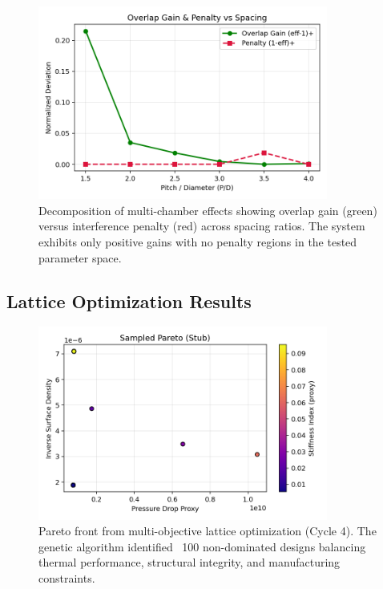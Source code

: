\begin{figure}[H]
    \centering
    \includegraphics[width=0.85\textwidth]{figures/simulations/multi_chamber_gain_penalty.png}
    \caption{Decomposition of multi-chamber effects showing overlap gain (green) versus interference penalty (red) across spacing ratios. The system exhibits only positive gains with no penalty regions in the tested parameter space.}
    \label{fig:gain_penalty}
\end{figure}

\subsection{Lattice Optimization Results}

\begin{figure}[H]
    \centering
    \includegraphics[width=0.85\textwidth]{figures/simulations/lattice_optimizer_stub.png}
    \caption{Pareto front from multi-objective lattice optimization (Cycle 4). The genetic algorithm identified ~100 non-dominated designs balancing thermal performance, structural integrity, and manufacturing constraints.}
    \label{fig:pareto_front}
\end{figure}


